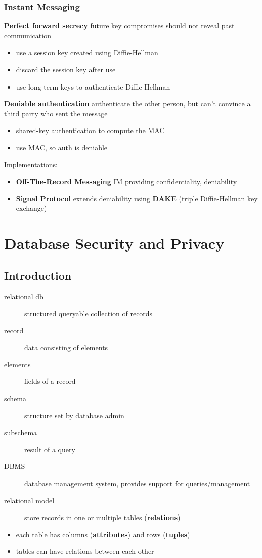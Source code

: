 \documentclass[]{article}
\theoremstyle{definition}
\begin{document}
	\subsubsection{Instant Messaging}
	\textbf{Perfect forward secrecy} future key compromises should not reveal past communication
	\begin{itemize}
		\item use a session key created using Diffie-Hellman
		\item discard the session key after use
		\item use long-term keys to authenticate Diffie-Hellman
	\end{itemize}
	\textbf{Deniable authentication} authenticate the other person, but can't convince a third party who sent the message
	\begin{itemize}
		\item shared-key authentication to compute the MAC
		\item use MAC, so auth is deniable
	\end{itemize}
	Implementations:
	\begin{itemize}
		\item \textbf{Off-The-Record Messaging} IM providing confidentiality, deniability
		\item \textbf{Signal Protocol} extends deniability using \textbf{DAKE} (triple Diffie-Hellman key exchange)
	\end{itemize}




	\section{Database Security and Privacy}
	\subsection{Introduction}
	\begin{description}
		\item[relational db] structured queryable collection of records
		\item[record] data consisting of elements
		\item[elements] fields of a record
		\item[schema] structure set by database admin
		\item[subschema] result of a query
		\item[DBMS] database management system, provides support for queries/management
		\item[relational model] store records in one or multiple tables (\textbf{relations})
	\end{description}
	\begin{itemize}
		\item each table has columns (\textbf{attributes}) and rows (\textbf{tuples})
		\item tables can have relations between each other
	\end{itemize}
\end{document}
